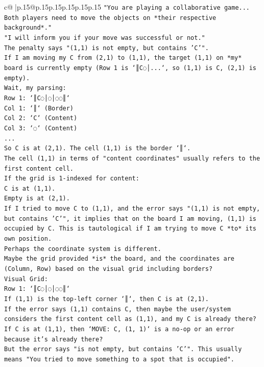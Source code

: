 \documentclass{article}
\begin{document}
{\begin{supertabular}{c@{$\;$}|p{.15\linewidth}@{}p{.15\linewidth}p{.15\linewidth}p{.15\linewidth}p{.15\linewidth}p{.15\linewidth}}
{{{\texttt{"You are playing a collaborative game... Both players need to move the objects on *their respective background*."} \\
\texttt{"I will inform you if your move was successful or not."} \\
\texttt{The penalty says "(1,1) is not empty, but contains 'C'".} \\
\texttt{If I am moving my C from (2,1) to (1,1), the target (1,1) on *my* board is currently empty (Row 1 is `║C◌│...`, so (1,1) is C, (2,1) is empty).} \\
\texttt{Wait, my parsing:} \\
\texttt{Row 1: `║C◌│◌│◌◌║`} \\
\texttt{Col 1: `║` (Border)} \\
\texttt{Col 2: `C` (Content)} \\
\texttt{Col 3: `◌` (Content)} \\
\texttt{...} \\
\texttt{So C is at (2,1). The cell (1,1) is the border `║`.} \\
\texttt{The cell (1,1) in terms of "content coordinates" usually refers to the first content cell.} \\
\texttt{If the grid is 1{-}indexed for content:} \\
\texttt{C is at (1,1).} \\
\texttt{Empty is at (2,1).} \\
\texttt{If I tried to move C to (1,1), and the error says "(1,1) is not empty, but contains 'C'", it implies that on the board I am moving, (1,1) is occupied by C. This is tautological if I am trying to move C *to* its own position.} \\
\texttt{Perhaps the coordinate system is different.} \\
\texttt{Maybe the grid provided *is* the board, and the coordinates are (Column, Row) based on the visual grid including borders?} \\
\texttt{Visual Grid:} \\
\texttt{Row 1: `║C◌│◌│◌◌║`} \\
\texttt{If (1,1) is the top{-}left corner `║`, then C is at (2,1).} \\
\texttt{If the error says (1,1) contains C, then maybe the user/system considers the first content cell as (1,1), and my C is already there?} \\
\texttt{If C is at (1,1), then `MOVE: C, (1, 1)` is a no{-}op or an error because it's already there?} \\
\texttt{But the error says "is not empty, but contains 'C'". This usually means "You tried to move something to a spot that is occupied".} \\
}}}
\end{supertabular}}
\end{document}
